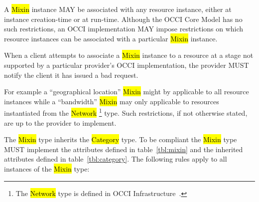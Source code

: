 \documentclass[10pt,a4paper]{article}
\begin{document}
A \hl{Mixin} instance MAY be associated with any resource instance,
either at instance creation-time or at run-time. Although the OCCI
Core Model has no such restrictions, an OCCI implementation MAY impose
restrictions on which resource instances can be associated with a
particular \hl{Mixin} instance.

When a client attempts to associate a \hl{Mixin} instance to a
resource at a stage not supported by a particular provider's OCCI
implementation, the provider MUST notify the client it has issued a
bad request.

For example a ``geographical location'' \hl{Mixin} might by applicable
to all resource instances while a ``bandwidth'' \hl{Mixin} may only
applicable to resources instantiated from the \hl{Network}
\footnote{The \hl{Network} type is defined in OCCI
  Infrastructure~\cite{occi:infrastructure}.}  type. Such
restrictions, if not otherwise stated, are up to the provider to
implement.


The \hl{Mixin} type inherits the \hl{Category} type. To be compliant
the \hl{Mixin} type MUST implement the attributes defined in
table~\ref{tbl:mixin} and the inherited attributes defined in
table~\ref{tbl:category}. The following rules apply to all instances
of the \hl{Mixin} type:
\end{document}
